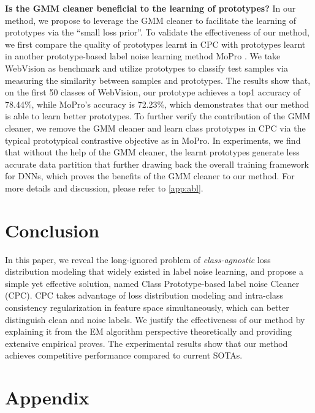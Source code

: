 \documentclass{article} \usepackage{iclr2023_conference,times}
\begin{document}
\textbf{Is the GMM cleaner beneficial to the learning of prototypes?}
In our method, we propose to leverage the GMM cleaner to facilitate the learning of prototypes via the ``small loss prior''. To validate the effectiveness of our method, we first compare the quality of prototypes learnt in CPC with prototypes learnt in another prototype-based label noise learning method MoPro \citep{li2020mopro}. We take WebVision as benchmark and utilize prototypes to classify test samples via measuring the similarity between samples and prototypes. The results show that, on the first 50 classes of WebVision, our prototype achieves a top1 accuracy of 78.44\%, while MoPro's accuracy is 72.23\%, which demonstrates that our method is able to learn better prototypes.
To further verify the contribution of the GMM cleaner, we remove the GMM cleaner and learn class prototypes in CPC via the typical prototypical contrastive objective as in MoPro. In experiments, we find that without the help of the GMM cleaner, the learnt prototypes generate less accurate data partition that further drawing back the overall training framework for DNNs, which proves the benefits of the GMM cleaner to our method. For more details and discussion, please refer to \ref{app:abl}.





\section{Conclusion}
In this paper, we reveal the long-ignored problem of \emph{class-agnostic} loss distribution modeling that widely existed in label noise learning, and propose a simple yet effective solution, named  Class Prototype-based label noise Cleaner (CPC). CPC takes advantage of loss distribution modeling and intra-class consistency regularization in feature space simultaneously, which can  better distinguish clean and noise labels. We  justify the effectiveness of our method by explaining it from the EM algorithm perspective theoretically and providing extensive empirical proves. The experimental results show that our method achieves competitive performance compared to current SOTAs. 





\appendix
\section{Appendix}
\end{document}
